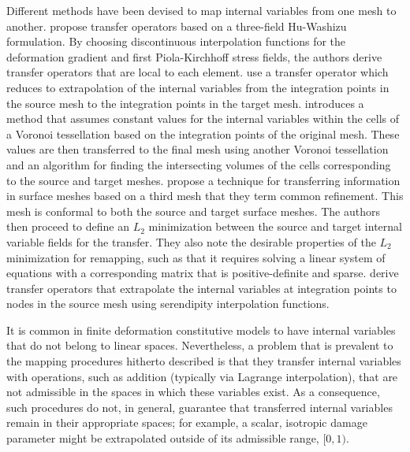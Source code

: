 \documentclass[12pt]{article}
\begin{document}
Different methods have been devised to map internal variables from one
mesh to another.  \citet{Ortiz.Quigley:1991} propose transfer
operators based on a three-field Hu-Washizu formulation. By choosing
discontinuous interpolation functions for the deformation gradient and
first Piola-Kirchhoff stress fields, the authors derive transfer
operators that are local to each
element. \citet{Radovitzky.Ortiz:1999} use a transfer operator which
reduces to extrapolation of the internal variables from the
integration points in the source mesh to the integration points in the
target mesh.  \citet{Rashid:2002} introduces a method that assumes
constant values for the internal variables within the cells of a
Voronoi tessellation based on the integration points of the original
mesh. These values are then transferred to the final mesh using
another Voronoi tessellation and an algorithm for finding the
intersecting volumes of the cells corresponding to the source and
target meshes. \citet{Jiao.Heath:2004} propose a technique for
transferring information in surface meshes based on a third mesh that
they term common refinement. This mesh is conformal to both the source
and target surface meshes. The authors then proceed to define an $L_2$
minimization between the source and target internal variable fields
for the transfer. They also note the desirable properties of the $L_2$
minimization for remapping, such as that it requires solving a linear
system of equations with a corresponding matrix that is
positive-definite and sparse. \citet{Bucher.etal:2007} derive transfer
operators that extrapolate the internal variables at integration
points to nodes in the source mesh using serendipity interpolation
functions.

It is common in finite deformation constitutive models to have
internal variables that do not belong to linear spaces. Nevertheless,
a problem that is prevalent to the mapping procedures hitherto
described is that they transfer internal variables with operations,
such as addition (typically via Lagrange interpolation), that are not
admissible in the spaces in which these variables exist. As a
consequence, such procedures do not, in general, guarantee that
transferred internal variables remain in their appropriate spaces; for
example, a scalar, isotropic damage parameter might be extrapolated
outside of its admissible range, $[0,1)$.
\end{document}

